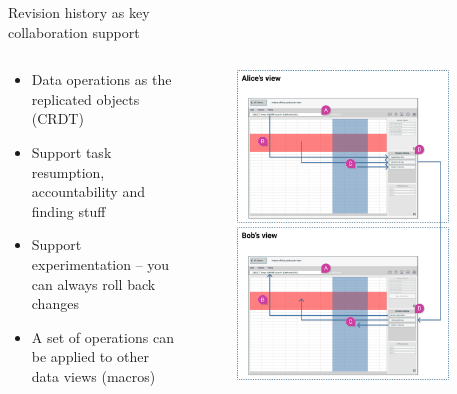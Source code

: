 \documentclass[aspectratio=169]{beamer}
\begin{document}

\begin{frame}{Revision history as key\\ collaboration support}
    \begin{columns}
        \begin{column}{0.5\textwidth}
            \begin{itemize}
                \small
                \item Data operations as the replicated objects (CRDT)
                \item Support task resumption, accountability and finding stuff
                \item Support experimentation -- you can always roll back changes
                \item A set of operations can be applied to other data views (macros)
            \end{itemize}
        \end{column}
        \begin{column}{0.5\textwidth}
            \begin{figure}[h]
                \vspace{-4em}
                \centering
                \includegraphics[width=0.9\textwidth]{images/shared-history.png}
            \end{figure}
        \end{column}
    \end{columns}
\end{frame}
\end{document}
